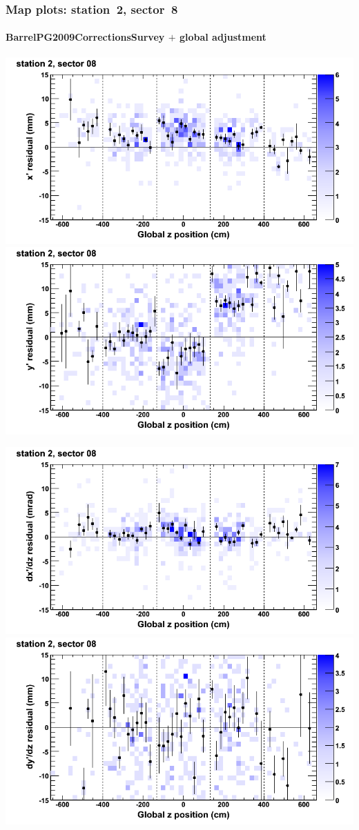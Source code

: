 \documentclass[compress]{beamer}
\begin{document}
\begin{frame}
\frametitle{Map plots: station~2, sector~8}
\framesubtitle{BarrelPG2009CorrectionsSurvey $+$ global adjustment}
\includegraphics[width=0.5\linewidth]{mapplots_re01/DTvsz_st2sec08_x.png}
\includegraphics[width=0.5\linewidth]{mapplots_re01/DTvsz_st2sec08_y.png}

\includegraphics[width=0.5\linewidth]{mapplots_re01/DTvsz_st2sec08_dxdz.png}
\includegraphics[width=0.5\linewidth]{mapplots_re01/DTvsz_st2sec08_dydz.png}
\end{frame}
\end{document}
